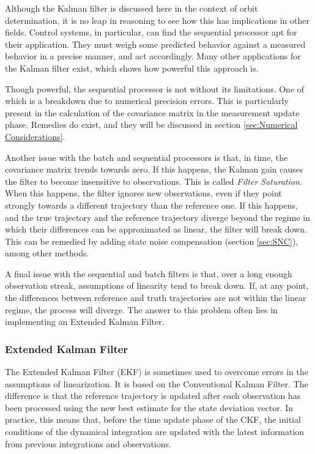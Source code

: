 \documentclass[12pt,a4paper,oneside]{article}
\numberwithin{equation}{section}   		%
\begin{document}
Although the Kalman filter is discussed here in the context of orbit determination, it is no leap in reasoning to see how this has implications in other fields. Control systems, in particular, can find the sequential processor apt for their application. They must weigh some predicted behavior against a measured behavior in a precise manner, and act accordingly. Many other applications for the Kalman filter exist, which shows how powerful this approach is. 

Though powerful, the sequential processor is not without its limitations. One of which is a breakdown due to numerical precision errors. This is particularly present in the calculation of the covariance matrix in the measurement update phase. Remedies do exist, and they will be discussed in section \ref{sec:Numerical Considerations}.

Another issue with the batch and sequential processors is that, in time, the covariance matrix trends towards zero. If this happens, the Kalman gain causes the filter to become insensitive to observations. This is called \emph{Filter Saturation}. When this happens, the filter ignores new observations, even if they point strongly towards a different trajectory than the reference one. If this happens, and the true trajectory and the reference trajectory diverge beyond the regime in which their differences can be approximated as linear, the filter will break down. This can be remedied by adding state noise compensation (section \ref{sec:SNC}), among other methods.

A final issue with the sequential and batch filters is that, over a long enough observation streak, assumptions of linearity tend to break down. If, at any point, the differences between reference and truth trajectories are not within the linear regime, the process will diverge. The answer to this problem often lies in implementing an Extended Kalman Filter. 




\subsubsection{Extended Kalman Filter}
\label{sec:Extended Kalman Filter}
The Extended Kalman Filter (EKF) is sometimes used to overcome errors in the assumptions of linearization. It is based on the Conventional Kalman Filter. The difference is that the reference trajectory is updated after each observation has been processed using the new best estimate for the state deviation vector. In practice, this means that, before the time update phase of the CKF, the initial conditions of the dynamical integration are updated with the latest information from previous integrations and observations. 
\end{document}

